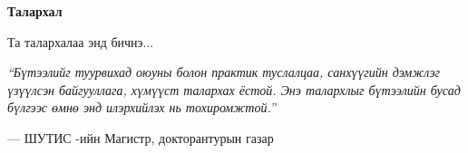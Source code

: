 \begin{center}
\textbf{\large Талархал}
\end{center}

Та талархалаа энд бичнэ...

\vspace{1cm}

\emph{``Бүтээлийг туурвихад оюуны болон практик туслалцаа, санхүүгийн дэмжлэг үзүүлсэн байгууллага, хүмүүст талархах ёстой. Энэ талархлыг бүтээлийн бусад бүлгээс өмнө энд илэрхийлэх нь тохиромжтой.''}

\hfill --- ШУТИС -ийн Магистр, докторантурын газар
